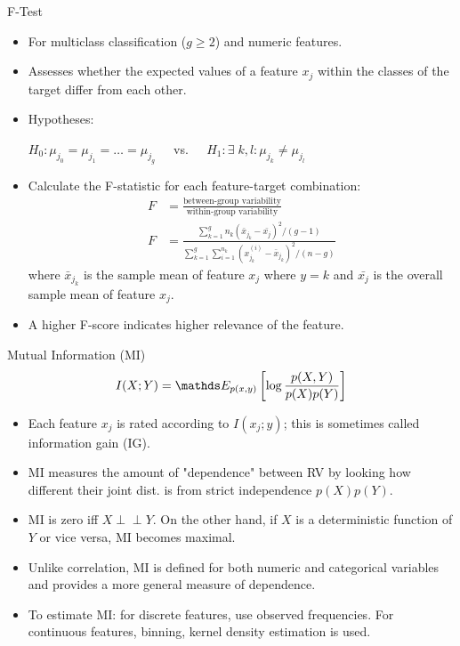 \documentclass[11pt,compress,t,notes=noshow, xcolor=table]{beamer}
\begin{document}
  \begin{vbframe}{F-Test}
  \begin{itemize}
    \item For multiclass classification ($g \ge 2$) and numeric features.
    \item Assesses whether the expected values of a feature $x_j$ within the classes of the target differ from each other.
    \item Hypotheses:

    $H_0: \mu_{j_0} = \mu_{j_1} = \dots = \mu_{j_g} \;\;\;\;$ vs. $\;\;\;\;H_1 : \exists \; k,l: \mu_{j_k} \neq \mu_{j_l}$
    \item Calculate the F-statistic for each feature-target combination:
    \begin{align*}
    F &= \frac{\text{between-group variability}}{\text{within-group variability}}\\
    F &= \frac{\sum_{k = 1}^g n_k (\bar{x}_{j_k} - \bar{x_j})^2/(g-1)}{\sum_{k = 1}^g \sum_{i = 1}^{n_k} (x_{j_k}^{(i)} - \bar{x}_{j_k})^2/(n-g)}
    \end{align*}
    where $\bar{x}_{j_k}$ is the sample mean of feature $x_j$ where $y = k$ and $\bar{x_{j}}$ is the overall sample mean of feature $x_j$.
  \item A higher F-score indicates higher relevance of the feature.
  \end{itemize}
  \end{vbframe}

  \begin{vbframe}{Mutual Information (MI)}
  $$I(X ; Y) = \E_{p(x, y)} \left[ \log \frac{p(X, Y)}{p(X) p(Y)} \right]$$

  \begin{itemize}
  \setlength{\itemsep}{0.8em}
    \item Each feature $x_j$ is rated according to $I(x_j;y)$; this is sometimes called information gain (IG).
    \item MI measures the amount of "dependence" between RV by looking how
    different their joint dist. is from strict independence $p(X)p(Y)$.
    \item MI is zero iff $X \perp \!\!\! \perp Y$. On the other hand, if $X$ is a deterministic function of $Y$ or vice versa, MI becomes maximal.
  \item Unlike correlation, MI is defined for both numeric and categorical variables and provides a more general measure of dependence.
  \item To estimate MI: for discrete features, use observed frequencies. For continuous features, binning, kernel density estimation is used.
  \end{itemize}
  \end{vbframe}

  \endlecture
\end{document}
